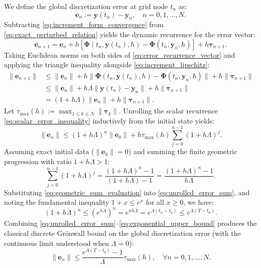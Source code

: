 \documentclass[11pt,a4paper]{article}
\theoremstyle{definition}
\theoremstyle{remark}
\begin{document}
We define the global discretization error at grid node $t_n$ as:
\begin{equation}
\label{eq:global_error_def}
\mathbf{e}_n := \mathbf{y}(t_n) - \mathbf{y}_n, \quad n = 0, 1, \dots, N.
\end{equation}
Subtracting \eqref{eq:increment_form_convergence} from \eqref{eq:exact_perturbed_relation} yields the dynamic recurrence for the error vector:
\begin{equation}
\label{eq:error_recurrence_vector}
\mathbf{e}_{n+1} = \mathbf{e}_n + h \left[ \mathbf{\Phi}(t_n, \mathbf{y}(t_n), h) - \mathbf{\Phi}(t_n, \mathbf{y}_n, h) \right] + h \boldsymbol{\tau}_{n+1}.
\end{equation}
Taking Euclidean norms on both sides of \eqref{eq:error_recurrence_vector} and applying the triangle inequality alongside \eqref{eq:increment_lipschitz}:
\begin{align}
\|\mathbf{e}_{n+1}\| &\le \|\mathbf{e}_n\| + h \|\mathbf{\Phi}(t_n, \mathbf{y}(t_n), h) - \mathbf{\Phi}(t_n, \mathbf{y}_n, h)\| + h \|\boldsymbol{\tau}_{n+1}\| \nonumber \\
&\le \|\mathbf{e}_n\| + h \Lambda \|\mathbf{y}(t_n) - \mathbf{y}_n\| + h \|\boldsymbol{\tau}_{n+1}\| \nonumber \\
&= (1 + h \Lambda) \|\mathbf{e}_n\| + h \|\boldsymbol{\tau}_{n+1}\|. \label{eq:scalar_error_inequality}
\end{align}
Let $\tau_{\max}(h) := \max_{1 \le k \le N} \|\boldsymbol{\tau}_k\|$. Unrolling the scalar recurrence \eqref{eq:scalar_error_inequality} inductively from the initial state yields:
\begin{equation}
\label{eq:unrolled_error_sum}
\|\mathbf{e}_n\| \le (1 + h\Lambda)^n \|\mathbf{e}_0\| + h \tau_{\max}(h) \sum_{j=0}^{n-1} (1 + h\Lambda)^j.
\end{equation}
Assuming exact initial data ($\|\mathbf{e}_0\| = 0$) and summing the finite geometric progression with ratio $1 + h\Lambda > 1$:
\begin{equation}
\label{eq:geometric_sum_evaluation}
\sum_{j=0}^{n-1} (1 + h\Lambda)^j = \frac{(1 + h\Lambda)^n - 1}{(1 + h\Lambda) - 1} = \frac{(1 + h\Lambda)^n - 1}{h\Lambda}.
\end{equation}
Substituting \eqref{eq:geometric_sum_evaluation} into \eqref{eq:unrolled_error_sum}, and noting the fundamental inequality $1 + x \le e^x$ for all $x \ge 0$, we have:
\begin{equation}
\label{eq:exponential_upper_bound}
(1 + h\Lambda)^n \le \left(e^{h\Lambda}\right)^n = e^{n h \Lambda} = e^{\Lambda (t_n - t_0)} \le e^{\Lambda(T - t_0)}.
\end{equation}
Combining \eqref{eq:unrolled_error_sum}--\eqref{eq:exponential_upper_bound} produces the classical discrete Gr\"onwall bound on the global discretization error (with the continuous limit understood when $\Lambda=0$):
\begin{equation}
\label{eq:global_convergence_bound}
\|\mathbf{e}_n\| \le \frac{e^{\Lambda(T - t_0)} - 1}{\Lambda} \tau_{\max}(h), \quad \forall n = 0, 1, \dots, N.
\end{equation}
\end{document}
